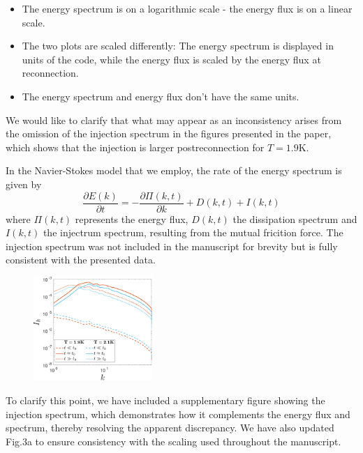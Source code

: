 \documentclass[a4paper,10pt]{article}
\begin{document}
\begin{enumerate}
    \begin{itemize}
        \item The energy spectrum is on a logarithmic scale - the energy flux is on a linear scale.
        \item The two plots are scaled differently: The energy spectrum is displayed in units of the code, while the energy flux is scaled by the energy flux at reconnection.
        \item The energy spectrum and energy flux don't have the same units.
    \end{itemize}
    We would like to clarify that what may appear as an inconsistency arises from the omission of the injection spectrum in the figures presented in the paper, which shows that the injection is larger postreconnection for $T=1.9$K.
    
    In the Navier-Stokes model that we employ, the rate of the energy spectrum is given by
    \begin{equation}
        \frac{\partial E(k)}{\partial t} = -\frac{\partial \Pi(k,t)}{\partial k} + D(k,t) + I(k,t)
    \end{equation}
    where $\Pi(k,t)$ represents the energy flux, $D(k,t)$ the dissipation spectrum and $I(k,t)$ the injectrum spectrum, resulting from the mutual fricition force. The injection spectrum was not included in the manuscript for brevity but is fully consistent with the presented data.

    \begin{figure}[H]
        \centering
        \includegraphics[width=0.4\textwidth]{inj-spec.pdf}
    \end{figure}

    To clarify this point, we have included a supplementary figure showing the injection spectrum, which demonstrates how it complements the energy flux and spectrum, thereby resolving the apparent discrepancy. We have also updated Fig.3a to ensure consistency with the scaling used throughout the manuscript.    




\end{enumerate}
\end{document}

